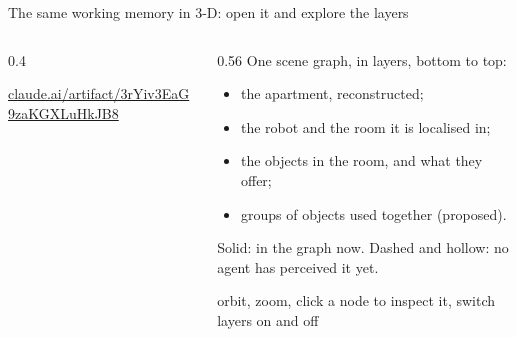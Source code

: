\documentclass[10pt, aspectratio=169]{beamer}
\begin{document}
\begin{frame}{The same working memory in 3-D: open it and explore the layers}
  \begin{columns}[c]
    \begin{column}{0.4\textwidth}
      \centering
      \\[0.6em]
      {\footnotesize\href{https://claude.ai/artifact/3rYiv3EaG9zaKGXLuHkJB8}{\textcolor{cool}{claude.ai/artifact/3rYiv3EaG9zaKGXLuHkJB8}}\par}
    \end{column}
    \begin{column}{0.56\textwidth}
      \small
      One scene graph, in layers, bottom to top:
      \begin{itemize}
        \item the apartment, reconstructed;
        \item the robot and the room it is localised in;
        \item the objects in the room, and what they offer;
        \item groups of objects used together (proposed).
      \end{itemize}
      \vspace{0.4em}
      Solid: in the graph now.\; Dashed and hollow: no agent has perceived it yet.\\[0.5em]
      {\footnotesize\color{black!70} orbit, zoom, click a node to inspect it, switch layers on and off\par}
    \end{column}
  \end{columns}
\end{frame}
\end{document}
